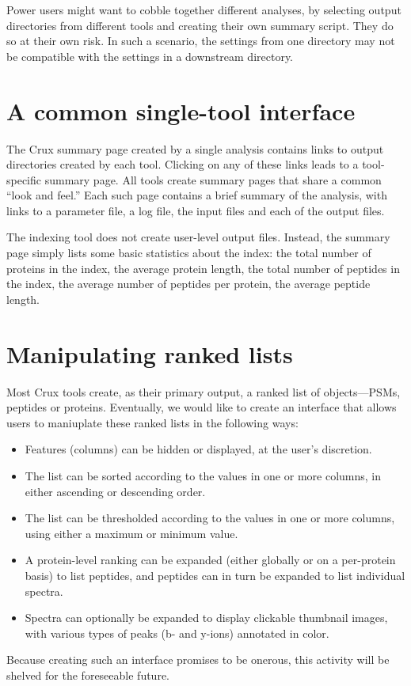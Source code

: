\documentclass{article}
\begin{document}
Power users might want to cobble together different analyses, by
selecting output directories from different tools and creating their
own summary script.  They do so at their own risk.  In such a
scenario, the settings from one directory may not be compatible with
the settings in a downstream directory.

\section{A common single-tool interface}

The Crux summary page created by a single analysis contains links to
output directories created by each tool.  Clicking on any of these
links leads to a tool-specific summary page.  All tools create summary
pages that share a common ``look and feel.''  Each such page contains
a brief summary of the analysis, with links to a parameter file,
a log file, the input files and each of the output files.

The indexing tool does not create user-level output files.  Instead,
the summary page simply lists some basic statistics about the index:
the total number of proteins in the index, the average protein length,
the total number of peptides in the index, the average number of
peptides per protein, the average peptide length.

\section{Manipulating ranked lists}

Most Crux tools create, as their primary output, a ranked list of
objects---PSMs, peptides or proteins.  Eventually, we would like to
create an interface that allows users to maniuplate these ranked lists
in the following ways:
\begin{itemize}
\item Features (columns) can be hidden or displayed, at the user's
  discretion.
\item The list can be sorted according to the values in one or more
  columns, in either ascending or descending order.
\item The list can be thresholded according to the values in one or
  more columns, using either a maximum or minimum value.
\item A protein-level ranking can be expanded (either globally or on a
  per-protein basis) to list peptides, and peptides can in turn be
  expanded to list individual spectra.
\item Spectra can optionally be expanded to display clickable
  thumbnail images, with various types of peaks (b- and y-ions)
  annotated in color.
\end{itemize}
Because creating such an interface promises to be onerous, this
activity will be shelved for the foreseeable future.
\end{document}
